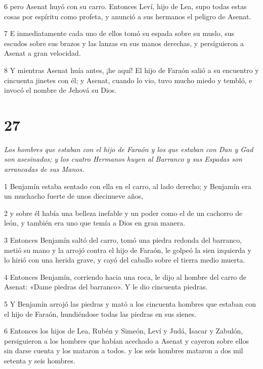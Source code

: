 \par 6 pero Asenat huyó con su carro. Entonces Leví, hijo de Lea, supo todas estas cosas por espíritu como profeta, y anunció a sus hermanos el peligro de Asenat.

\par 7 E inmediatamente cada uno de ellos tomó su espada sobre su muslo, sus escudos sobre sus brazos y las lanzas en sus manos derechas, y persiguieron a Asenat a gran velocidad.

\par 8 Y mientras Asenat huía antes, ¡he aquí! El hijo de Faraón salió a su encuentro y cincuenta jinetes con él; y Asenat, cuando lo vio, tuvo mucho miedo y tembló, e invocó el nombre de Jehová su Dios.

\chapter{27}

\par \textit{Los hombres que estaban con el hijo de Faraón y los que estaban con Dan y Gad son asesinados; y los cuatro Hermanos huyen al Barranco y sus Espadas son arrancadas de sus Manos.}


\par 1 Benjamín estaba sentado con ella en el carro, al lado derecho; y Benjamín era un muchacho fuerte de unos diecinueve años,

\par 2 y sobre él había una belleza inefable y un poder como el de un cachorro de león, y también era uno que temía a Dios en gran manera.

\par 3 Entonces Benjamín saltó del carro, tomó una piedra redonda del barranco, metió su mano y la arrojó contra el hijo de Faraón, le golpeó la sien izquierda y lo hirió con una herida grave, y cayó del caballo sobre el tierra medio muerta.

\par 4 Entonces Benjamín, corriendo hacia una roca, le dijo al hombre del carro de Asenat: «Dame piedras del barranco». Y le dio cincuenta piedras.

\par 5 Y Benjamín arrojó las piedras y mató a los cincuenta hombres que estaban con el hijo de Faraón, hundiéndose todas las piedras en sus sienes.

\par 6 Entonces los hijos de Lea, Rubén y Simeón, Leví y Judá, Isacar y Zabulón, persiguieron a los hombres que habían acechado a Asenat y cayeron sobre ellos sin darse cuenta y los mataron a todos. y los seis hombres mataron a dos mil setenta y seis hombres.


